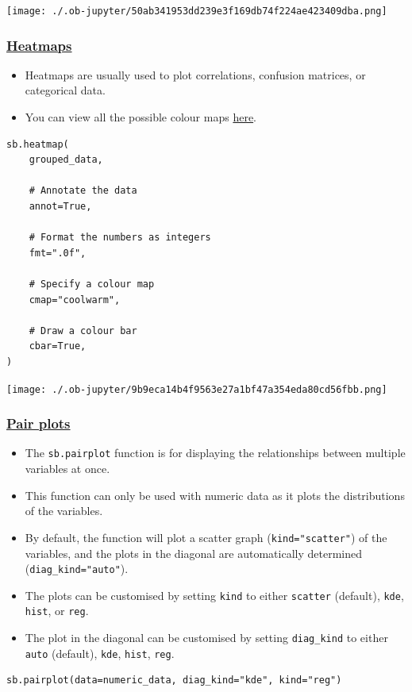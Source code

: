 \documentclass[11pt]{article}
\begin{document}
\begin{center}
\texttt{[image: ./.ob-jupyter/50ab341953dd239e3f169db74f224ae423409dba.png]}
\label{org97d4215}
\end{center}

 \newpage
\subsubsection{\href{https://seaborn.pydata.org/generated/seaborn.heatmap.html}{Heatmaps}}
\label{sec:orge9ea090}
\begin{itemize}
\item Heatmaps are usually used to plot correlations, confusion matrices, or categorical data.
\item You can view all the possible colour maps \href{https://matplotlib.org/stable/users/explain/colors/colormaps.html\#classes-of-colormaps}{here}.
\end{itemize}
\begin{verbatim}
sb.heatmap(
    grouped_data,

    # Annotate the data
    annot=True,

    # Format the numbers as integers
    fmt=".0f",

    # Specify a colour map
    cmap="coolwarm",

    # Draw a colour bar
    cbar=True,
)
\end{verbatim}

\begin{center}
\texttt{[image: ./.ob-jupyter/9b9eca14b4f9563e27a1bf47a354eda80cd56fbb.png]}
\label{org618a697}
\end{center}

 \newpage
\subsubsection{\href{https://seaborn.pydata.org/generated/seaborn.pairplot.html}{Pair plots}}
\label{sec:org2c31f3a}
\begin{itemize}
\item The \texttt{sb.pairplot} function is for displaying the relationships between multiple variables at once.
\item This function can only be used with numeric data as it plots the distributions of the variables.
\item By default, the function will plot a scatter graph (\texttt{kind="scatter"}) of the variables, and the plots in the diagonal are automatically determined (\texttt{diag\_kind="auto"}).
\item The plots can be customised by setting \texttt{kind} to either \texttt{scatter} (default), \texttt{kde}, \texttt{hist}, or \texttt{reg}.
\item The plot in the diagonal can be customised by setting \texttt{diag\_kind} to either \texttt{auto} (default), \texttt{kde}, \texttt{hist}, \texttt{reg}.
\end{itemize}
\begin{verbatim}
sb.pairplot(data=numeric_data, diag_kind="kde", kind="reg")
\end{verbatim}
\end{document}
